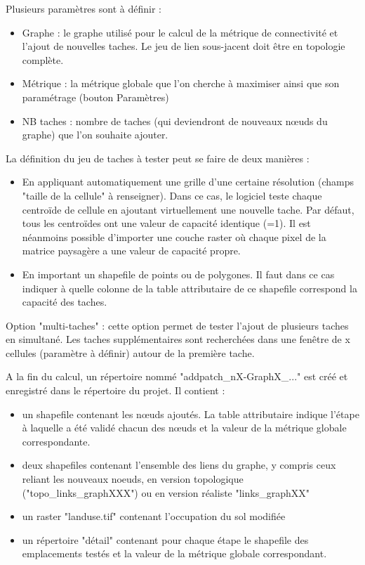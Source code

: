 \documentclass{article}
\begin{document}
Plusieurs paramètres sont à définir :
\begin{itemize}
	\item Graphe : le graphe utilisé pour le calcul de la métrique de connectivité et l’ajout de nouvelles taches. Le jeu de lien sous-jacent doit être en topologie complète.
	\item Métrique : la métrique globale que l’on cherche à maximiser ainsi que son paramétrage (bouton Paramètres)
	\item NB taches : nombre de taches (qui deviendront de nouveaux nœuds du graphe) que l’on souhaite ajouter.
\end{itemize}

La définition du jeu de taches à tester peut se faire de deux manières : 
\begin{itemize}
	\item En appliquant automatiquement une grille d’une certaine résolution (champs "taille de la cellule" à renseigner). Dans ce cas, le logiciel teste chaque centroïde de cellule en ajoutant virtuellement une nouvelle tache. Par défaut, tous les centroïdes ont une valeur de capacité identique (=1). Il est néanmoins possible d’importer une couche raster où chaque pixel de la matrice paysagère a une valeur de capacité propre.
	\item En important un shapefile de points ou de polygones. Il faut dans ce cas indiquer à quelle colonne de la table attributaire de ce shapefile correspond la capacité des taches.
\end{itemize}

Option "multi-taches" : cette option permet de tester l’ajout de plusieurs taches en simultané. Les taches supplémentaires sont recherchées dans une fenêtre de x cellules (paramètre à définir) autour de la première tache. 

A la fin du calcul, un répertoire nommé "addpatch\_nX-GraphX\_..." est créé et enregistré dans le répertoire du projet. Il contient :
\begin{itemize}
	\item un shapefile contenant les nœuds ajoutés. La table attributaire indique l’étape à laquelle a été validé chacun des nœuds et la valeur de la métrique globale correspondante.
	\item deux shapefiles contenant l’ensemble des liens du graphe, y compris ceux reliant les nouveaux noeuds, en version topologique ("topo\_links\_graphXXX") ou en version réaliste "links\_graphXX"
	\item un raster "landuse.tif" contenant l'occupation du sol modifiée
	\item un répertoire "détail" contenant pour chaque étape le shapefile des emplacements testés et la valeur de la métrique globale correspondant.
\end{itemize}
\end{document}
